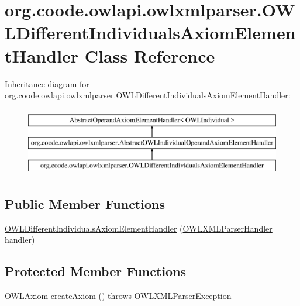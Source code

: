 \hypertarget{classorg_1_1coode_1_1owlapi_1_1owlxmlparser_1_1_o_w_l_different_individuals_axiom_element_handler}{\section{org.\-coode.\-owlapi.\-owlxmlparser.\-O\-W\-L\-Different\-Individuals\-Axiom\-Element\-Handler Class Reference}
\label{classorg_1_1coode_1_1owlapi_1_1owlxmlparser_1_1_o_w_l_different_individuals_axiom_element_handler}
}
Inheritance diagram for org.\-coode.\-owlapi.\-owlxmlparser.\-O\-W\-L\-Different\-Individuals\-Axiom\-Element\-Handler\-:\begin{figure}[H]
\begin{center}
\leavevmode
\includegraphics[height=3.000000cm]{classorg_1_1coode_1_1owlapi_1_1owlxmlparser_1_1_o_w_l_different_individuals_axiom_element_handler}
\end{center}
\end{figure}
\subsection*{Public Member Functions}
\begin{DoxyCompactItemize}
\item 
\hyperlink{classorg_1_1coode_1_1owlapi_1_1owlxmlparser_1_1_o_w_l_different_individuals_axiom_element_handler_aa30bac8554be9895828aa8f6922b3eb3}{O\-W\-L\-Different\-Individuals\-Axiom\-Element\-Handler} (\hyperlink{classorg_1_1coode_1_1owlapi_1_1owlxmlparser_1_1_o_w_l_x_m_l_parser_handler}{O\-W\-L\-X\-M\-L\-Parser\-Handler} handler)
\end{DoxyCompactItemize}
\subsection*{Protected Member Functions}
\begin{DoxyCompactItemize}
\item 
\hyperlink{interfaceorg_1_1semanticweb_1_1owlapi_1_1model_1_1_o_w_l_axiom}{O\-W\-L\-Axiom} \hyperlink{classorg_1_1coode_1_1owlapi_1_1owlxmlparser_1_1_o_w_l_different_individuals_axiom_element_handler_ab204df5b847c32c1d18567fb06e137cb}{create\-Axiom} ()  throws O\-W\-L\-X\-M\-L\-Parser\-Exception 
\end{DoxyCompactItemize}


